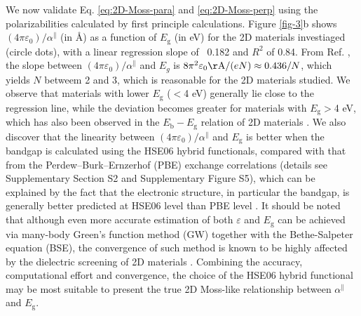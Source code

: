 \documentclass[journal=ancac3,manuscript=article,email=true,hyperref=true,keywords=false]{achemso}
\begin{document}
We now validate Eq. \ref{eq:2D-Moss-para} and \ref{eq:2D-Moss-perp}
using the polarizabilities calculated by first principle
calculations. Figure \ref{fig-3}b shows
$(4 \pi \varepsilon_{0})/\alpha^{\parallel}$ (in \AA{}) as a function
of $E_{\mathrm{g}}$ (in eV) for the 2D materials investiaged (circle
dots), with a linear regression slope of ~0.182 and $R^{2}$ of
0.84. From Ref. , the slope between
$(4 \pi \varepsilon_{0})/\alpha^{\parallel}$ and $E_{g}$ is
$8\pi^{2}\varepsilon_{0} \mathrm{\AA}/(eN) \approx 0.436/N$, which
yields $N$ betweem 2 and 3, which is reasonable for the 2D materials
studied. We observe that materials with lower $E_{\mathrm{g}}$ ($<$4
eV) generally lie close to the regression line, while the deviation
becomes greater for materials with $E_{\mathrm{g}}>$4 eV, which has
also been observed in the $E_{\mathrm{b}}-E_{\mathrm{g}}$ relation of
2D materials \cite{Olsen_2016_hydrogen,Jiang_2017_Eg_Eb}. We also
discover that the linearity between
$(4 \pi \varepsilon_{0})/\alpha^{\parallel}$ and $E_{\mathrm{g}}$ is
better when the bandgap is calculated using the HSE06 hybrid
functionals, compared with that from the Perdew--Burk--Ernzerhof (PBE)
exchange correlations (details see Supplementary Section S2 and
Supplementary Figure S5), which can be explained by the fact that the
electronic structure, in particular the bandgap, is generally better
predicted at HSE06 level than PBE level \cite{Heyd_2005}. It should be
noted that although even more accurate estimation of both
$\varepsilon$ and $E_{\mathrm{g}}$ can be achieved via many-body
Green’s function method (GW) together with the Bethe-Salpeter
equation (BSE), the convergence of such method is known to be highly
affected by the dielectric screening of 2D materials
\cite{Hueser_2013_2Dvs3D}. Combining the accuracy, computational
effort and convergence, the choice of the HSE06 hybrid functional may
be most suitable to present the true 2D Moss-like relationship between
$\alpha^{\parallel}$ and $E_{\mathrm{g}}$.
\end{document}
